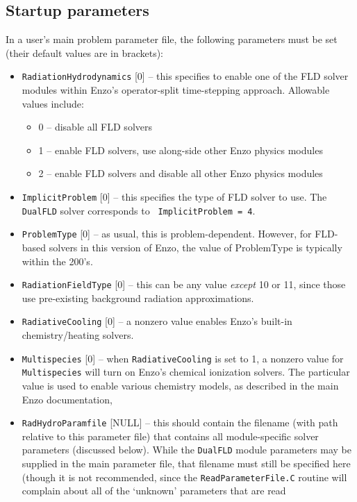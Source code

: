 \documentclass[letterpaper,10pt]{article}
\renewcommand{\(}{\left(}
\renewcommand{\)}{\right)}
\begin{document}
\subsection{Startup parameters}

In a user's main problem parameter file, the following parameters
must be set (their default values are in brackets):
\begin{itemize}
\item {\tt RadiationHydrodynamics} [0] -- this specifies to enable one
  of the FLD solver modules within Enzo's operator-split time-stepping
  approach.  Allowable values include:
  \begin{itemize}
  \item 0 -- disable all FLD solvers
  \item 1 -- enable FLD solvers, use along-side other Enzo physics modules
  \item 2 -- enable FLD solvers and disable all other Enzo physics modules
  \end{itemize}
\item {\tt ImplicitProblem} [0] -- this specifies the type of FLD
  solver to use.  The {\tt DualFLD} solver corresponds to {\tt
  ImplicitProblem = 4}.
\item {\tt ProblemType} [0] -- as usual, this is problem-dependent.
  However, for FLD-based solvers in this version of Enzo, the value of
  ProblemType is typically within the 200's.
\item {\tt RadiationFieldType} [0] -- this can be any value {\em except}
  10 or 11, since those use pre-existing background radiation
  approximations.
\item {\tt RadiativeCooling} [0] -- a nonzero value enables Enzo's
  built-in chemistry/heating solvers.
\item {\tt Multispecies} [0] -- when {\tt RadiativeCooling} is set to
  1, a nonzero value for {\tt Multispecies} will turn on Enzo's
  chemical ionization solvers.  The particular value is used to
  enable various chemistry models, as described in the main Enzo
  documentation, 
\item {\tt RadHydroParamfile} [NULL] -- this should contain the filename
  (with path relative to this parameter file) that contains all
  module-specific solver parameters (discussed below).  While the 
  {\tt DualFLD} module parameters may be supplied in the main
  parameter file, that filename must still be specified here (though
  it is not recommended, since the {\tt ReadParameterFile.C} routine
  will complain about all of the `unknown' parameters that are read

\end{itemize}
\end{document}
